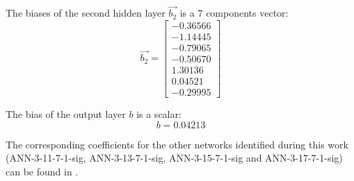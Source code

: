 \documentclass[preprint,12pt,times]{elsarticle}
\begin{document}
The biases of the second hidden layer $\overrightarrow{b_2}$ is a $7$ components vector:
\begin{equation*}
\overrightarrow{b_2}=\left[
\begin{array}{r}
 -0.36566\\
 -1.14445\\
 -0.79065\\
 -0.50670\\
  1.30136\\
  0.04521\\
 -0.29995
\end{array}\right]
\end{equation*}

The bias of the output layer $b$ is a scalar:
\begin{equation*}
b=0.04213
\end{equation*}

The corresponding coefficients for the other networks identified during this work (ANN-3-11-7-1-sig, ANN-3-13-7-1-sig, ANN-3-15-7-1-sig and ANN-3-17-7-1-sig) can be found in \cite{pantale_Coefficients_2022}.

%
\end{document}

